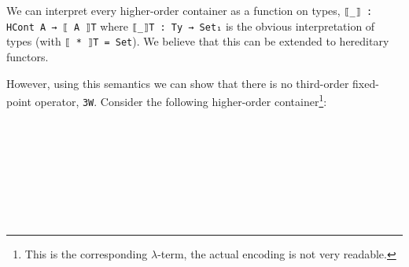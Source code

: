 \documentclass{easychair}
\begin{document}
We can interpret every higher-order container as a function on types, \texttt{⟦\_⟧ :
HCont A → ⟦ A ⟧T} where \texttt{⟦\_⟧T  : Ty → Set₁} is the obvious
interpretation of types (with \texttt{⟦ * ⟧T = Set}). We believe that this can
be extended to hereditary functors.

However, using this semantics
we can show that there is no third-order fixed-point operator, \texttt{3W}.
Consider the following higher-order container\footnote{This is the corresponding 
$\lambda$-term, the actual encoding is not very readable.}:

\begin{code}[hide]%
\>[0]\AgdaSpace{}%
\AgdaSpace{}%
\<%
\\
\>[0]\AgdaSpace{}%
\AgdaSpace{}%
\AgdaSymbol{:}\AgdaSpace{}%
\AgdaSpace{}%
\<%
\\
\>[0][@{}l@{\AgdaIndent{0}}]%
\>[2]\AgdaInductiveConstructor{*}\AgdaSpace{}%
\AgdaSymbol{:}\AgdaSpace{}%
\<%
\\
%
\>[2]\AgdaSpace{}%
\AgdaSymbol{:}\AgdaSpace{}%
\AgdaSpace{}%
\AgdaSpace{}%
\AgdaSpace{}%
\AgdaSpace{}%
\<%
\\
%
\\[\AgdaEmptyExtraSkip]%
\>[0]\AgdaSpace{}%
\AgdaSpace{}%
\AgdaSymbol{:}\AgdaSpace{}%
\AgdaSpace{}%
\AgdaSpace{}%
\AgdaSpace{}%
\<%
\end{code}

\begin{code}%
\>[0]\AgdaSpace{}%
\AgdaSymbol{:}\AgdaSpace{}%
\AgdaSpace{}%
\AgdaSymbol{(((}\AgdaInductiveConstructor{*}\AgdaSpace{}%
\AgdaSpace{}%
\AgdaInductiveConstructor{*}\AgdaSymbol{)}\AgdaSpace{}%
\AgdaSpace{}%
\AgdaInductiveConstructor{*}\AgdaSymbol{)}\AgdaSpace{}%
\AgdaSpace{}%
\AgdaSymbol{(}\AgdaInductiveConstructor{*}\AgdaSpace{}%
\AgdaSpace{}%
\AgdaInductiveConstructor{*}\AgdaSymbol{)}\AgdaSpace{}%
\AgdaSpace{}%
\AgdaInductiveConstructor{*}\AgdaSymbol{)}\<%
\\
\>[0]\AgdaSpace{}%
\AgdaSpace{}%
\AgdaSpace{}%
\AgdaSymbol{=}\AgdaSpace{}%
\AgdaSpace{}%
\AgdaSymbol{(}\AgdaSpace{}%
\AgdaSymbol{)}\<%
\end{code}
\end{document}
